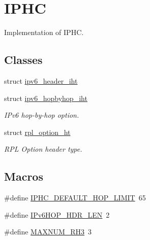 \hypertarget{group___i_p_h_c}{}\section{I\+P\+HC}
\label{group___i_p_h_c}


Implementation of I\+P\+HC.  


\subsection*{Classes}
\begin{DoxyCompactItemize}
\item 
struct \hyperlink{structipv6__header__iht}{ipv6\+\_\+header\+\_\+iht}
\item 
struct \hyperlink{structipv6__hopbyhop__iht}{ipv6\+\_\+hopbyhop\+\_\+iht}
\begin{DoxyCompactList}\small\item\em I\+Pv6 hop-\/by-\/hop option. \end{DoxyCompactList}\item 
struct \hyperlink{structrpl__option__ht}{rpl\+\_\+option\+\_\+ht}
\begin{DoxyCompactList}\small\item\em R\+PL Option header type. \end{DoxyCompactList}\end{DoxyCompactItemize}
\subsection*{Macros}
\begin{DoxyCompactItemize}
\item 
\#define \hyperlink{group___i_p_h_c_ga320b1d67b93309eeedfa96d2505816c1}{I\+P\+H\+C\+\_\+\+D\+E\+F\+A\+U\+L\+T\+\_\+\+H\+O\+P\+\_\+\+L\+I\+M\+IT}~65
\item 
\#define \hyperlink{group___i_p_h_c_ga251d45c44deb607ae20f0844cb4428c0}{I\+Pv6\+H\+O\+P\+\_\+\+H\+D\+R\+\_\+\+L\+EN}~2
\item 
\#define \hyperlink{group___i_p_h_c_ga4ec48eab341b4cbcbc00238435f650e2}{M\+A\+X\+N\+U\+M\+\_\+\+R\+H3}~3
\end{DoxyCompactItemize}
